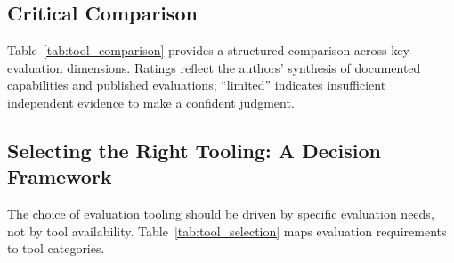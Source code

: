 \subsection{Critical Comparison}

Table~\ref{tab:tool_comparison} provides a structured comparison across key evaluation dimensions. Ratings reflect the authors' synthesis of documented capabilities and published evaluations; ``limited'' indicates insufficient independent evidence to make a confident judgment.

\begin{table}[htbp]
\centering
\caption{Critical comparison of evaluation tools across key dimensions (O=Open source, C=Commercial; ratings: H=high, M=medium, L=low, ?=insufficient evidence).}
\label{tab:tool_comparison}
\end{table}

\subsection{Selecting the Right Tooling: A Decision Framework}

The choice of evaluation tooling should be driven by specific evaluation needs, not by tool availability. Table~\ref{tab:tool_selection} maps evaluation requirements to tool categories.

